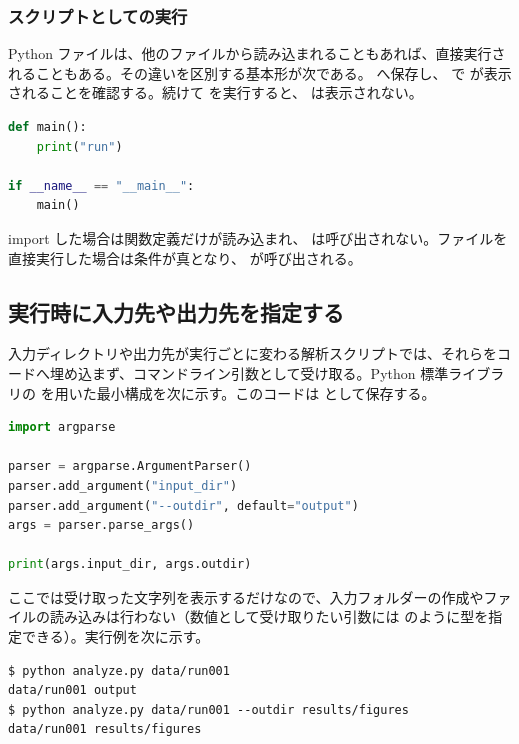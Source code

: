 \subsubsection{スクリプトとしての実行}

Python ファイルは、他のファイルから読み込まれることもあれば、直接実行されることもある。その違いを区別する基本形が次である。 へ保存し、 で  が表示されることを確認する。続けて  を実行すると、 は表示されない。

\begin{lstlisting}[language=Python]
def main():
    print("run")

if __name__ == "__main__":
    main()
\end{lstlisting}

import した場合は関数定義だけが読み込まれ、 は呼び出されない。ファイルを直接実行した場合は条件が真となり、 が呼び出される。

\subsection{実行時に入力先や出力先を指定する}
\label{sec:command-line-args}

入力ディレクトリや出力先が実行ごとに変わる解析スクリプトでは、それらをコードへ埋め込まず、コマンドライン引数として受け取る。Python 標準ライブラリの  を用いた最小構成を次に示す。このコードは  として保存する。

\begin{lstlisting}[language=Python, title=analyze.py]
import argparse

parser = argparse.ArgumentParser()
parser.add_argument("input_dir")
parser.add_argument("--outdir", default="output")
args = parser.parse_args()

print(args.input_dir, args.outdir)
\end{lstlisting}

ここでは受け取った文字列を表示するだけなので、入力フォルダーの作成やファイルの読み込みは行わない（数値として受け取りたい引数には  のように型を指定できる）。実行例を次に示す。

\begin{lstlisting}[numbers=none, xleftmargin=2\zw]
$ python analyze.py data/run001
data/run001 output
$ python analyze.py data/run001 --outdir results/figures
data/run001 results/figures
\end{lstlisting}

